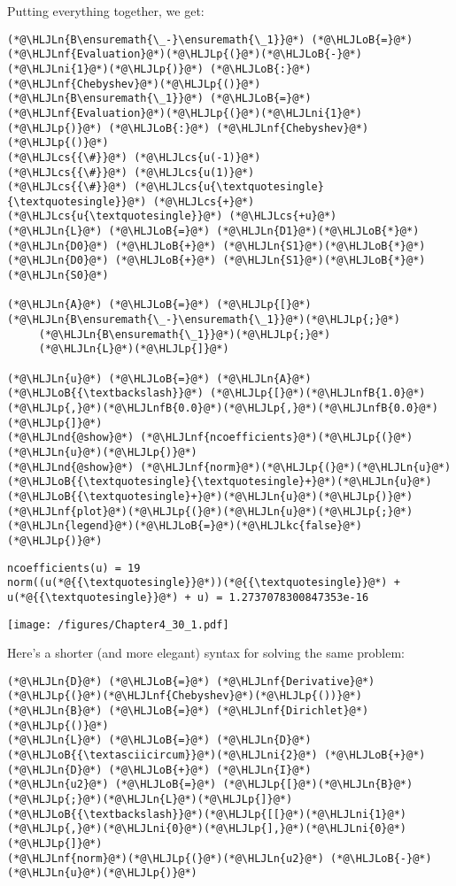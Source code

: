 \documentclass[12pt,a4paper]{article}
\newcommand{\HLJLkc}[1]{\textcolor[RGB]{59,151,46}{\textit{#1}}}
\newcommand{\HLJLn}[1]{#1}
\newcommand{\HLJLnd}[1]{\textcolor[RGB]{214,102,97}{#1}}
\newcommand{\HLJLnf}[1]{\textcolor[RGB]{66,102,213}{#1}}
\newcommand{\HLJLnfB}[1]{\textcolor[RGB]{59,151,46}{#1}}
\newcommand{\HLJLni}[1]{\textcolor[RGB]{59,151,46}{#1}}
\newcommand{\HLJLoB}[1]{\textcolor[RGB]{102,102,102}{\textbf{#1}}}
\newcommand{\HLJLp}[1]{#1}
\newcommand{\HLJLcs}[1]{\textcolor[RGB]{153,153,119}{\textit{#1}}}
\begin{document}
Putting everything together, we get:


\begin{lstlisting}
(*@\HLJLn{B\ensuremath{\_-}\ensuremath{\_1}}@*) (*@\HLJLoB{=}@*) (*@\HLJLnf{Evaluation}@*)(*@\HLJLp{(}@*)(*@\HLJLoB{-}@*)(*@\HLJLni{1}@*)(*@\HLJLp{)}@*) (*@\HLJLoB{:}@*) (*@\HLJLnf{Chebyshev}@*)(*@\HLJLp{()}@*)
(*@\HLJLn{B\ensuremath{\_1}}@*) (*@\HLJLoB{=}@*) (*@\HLJLnf{Evaluation}@*)(*@\HLJLp{(}@*)(*@\HLJLni{1}@*)(*@\HLJLp{)}@*) (*@\HLJLoB{:}@*) (*@\HLJLnf{Chebyshev}@*)(*@\HLJLp{()}@*)
(*@\HLJLcs{{\#}}@*) (*@\HLJLcs{u(-1)}@*)
(*@\HLJLcs{{\#}}@*) (*@\HLJLcs{u(1)}@*)
(*@\HLJLcs{{\#}}@*) (*@\HLJLcs{u{\textquotesingle}{\textquotesingle}}@*) (*@\HLJLcs{+}@*) (*@\HLJLcs{u{\textquotesingle}}@*) (*@\HLJLcs{+u}@*)
(*@\HLJLn{L}@*) (*@\HLJLoB{=}@*) (*@\HLJLn{D1}@*)(*@\HLJLoB{*}@*)(*@\HLJLn{D0}@*) (*@\HLJLoB{+}@*) (*@\HLJLn{S1}@*)(*@\HLJLoB{*}@*)(*@\HLJLn{D0}@*) (*@\HLJLoB{+}@*) (*@\HLJLn{S1}@*)(*@\HLJLoB{*}@*)(*@\HLJLn{S0}@*)

(*@\HLJLn{A}@*) (*@\HLJLoB{=}@*) (*@\HLJLp{[}@*)(*@\HLJLn{B\ensuremath{\_-}\ensuremath{\_1}}@*)(*@\HLJLp{;}@*)
     (*@\HLJLn{B\ensuremath{\_1}}@*)(*@\HLJLp{;}@*)
     (*@\HLJLn{L}@*)(*@\HLJLp{]}@*)

(*@\HLJLn{u}@*) (*@\HLJLoB{=}@*) (*@\HLJLn{A}@*) (*@\HLJLoB{{\textbackslash}}@*) (*@\HLJLp{[}@*)(*@\HLJLnfB{1.0}@*)(*@\HLJLp{,}@*)(*@\HLJLnfB{0.0}@*)(*@\HLJLp{,}@*)(*@\HLJLnfB{0.0}@*)(*@\HLJLp{]}@*)
(*@\HLJLnd{@show}@*) (*@\HLJLnf{ncoefficients}@*)(*@\HLJLp{(}@*)(*@\HLJLn{u}@*)(*@\HLJLp{)}@*)
(*@\HLJLnd{@show}@*) (*@\HLJLnf{norm}@*)(*@\HLJLp{(}@*)(*@\HLJLn{u}@*)(*@\HLJLoB{{\textquotesingle}{\textquotesingle}+}@*)(*@\HLJLn{u}@*)(*@\HLJLoB{{\textquotesingle}+}@*)(*@\HLJLn{u}@*)(*@\HLJLp{)}@*)
(*@\HLJLnf{plot}@*)(*@\HLJLp{(}@*)(*@\HLJLn{u}@*)(*@\HLJLp{;}@*)(*@\HLJLn{legend}@*)(*@\HLJLoB{=}@*)(*@\HLJLkc{false}@*)(*@\HLJLp{)}@*)
\end{lstlisting}

\begin{lstlisting}
ncoefficients(u) = 19
norm((u(*@{{\textquotesingle}}@*))(*@{{\textquotesingle}}@*) + u(*@{{\textquotesingle}}@*) + u) = 1.2737078300847353e-16
\end{lstlisting}

\texttt{[image: /figures/Chapter4\_30\_1.pdf]}

Here's a shorter (and more elegant) syntax for solving the same problem:


\begin{lstlisting}
(*@\HLJLn{D}@*) (*@\HLJLoB{=}@*) (*@\HLJLnf{Derivative}@*)(*@\HLJLp{(}@*)(*@\HLJLnf{Chebyshev}@*)(*@\HLJLp{())}@*)
(*@\HLJLn{B}@*) (*@\HLJLoB{=}@*) (*@\HLJLnf{Dirichlet}@*)(*@\HLJLp{()}@*)
(*@\HLJLn{L}@*) (*@\HLJLoB{=}@*) (*@\HLJLn{D}@*)(*@\HLJLoB{{\textasciicircum}}@*)(*@\HLJLni{2}@*) (*@\HLJLoB{+}@*) (*@\HLJLn{D}@*) (*@\HLJLoB{+}@*) (*@\HLJLn{I}@*)
(*@\HLJLn{u2}@*) (*@\HLJLoB{=}@*) (*@\HLJLp{[}@*)(*@\HLJLn{B}@*)(*@\HLJLp{;}@*)(*@\HLJLn{L}@*)(*@\HLJLp{]}@*)(*@\HLJLoB{{\textbackslash}}@*)(*@\HLJLp{[[}@*)(*@\HLJLni{1}@*)(*@\HLJLp{,}@*)(*@\HLJLni{0}@*)(*@\HLJLp{],}@*)(*@\HLJLni{0}@*)(*@\HLJLp{]}@*)
(*@\HLJLnf{norm}@*)(*@\HLJLp{(}@*)(*@\HLJLn{u2}@*) (*@\HLJLoB{-}@*) (*@\HLJLn{u}@*)(*@\HLJLp{)}@*)
\end{lstlisting}
\end{document}
